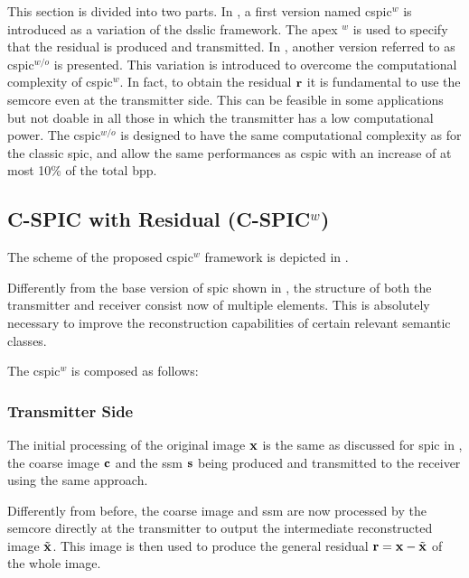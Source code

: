 This section is divided into two parts. In , a first version named \gls{cspic}$^w$ is introduced as a variation of the \gls{dsslic} framework. The apex $^w$ is used to specify that the residual is produced and transmitted. In , another version referred to as \gls{cspic}$^{w/o}$ is presented. This variation is introduced to overcome the computational complexity of \gls{cspic}$^w$. In fact, to obtain the residual $\mathbf{r}$ it is fundamental to use the \gls{semcore} even at the transmitter side. This can be feasible in some applications but not doable in all those in which the transmitter has a low computational power. The \gls{cspic}$^{w/o}$ is designed to have the same computational complexity as for the classic \gls{spic}, and allow the same performances as \gls{cspic} with an increase of at most 10\% of the total \gls{bpp}.

\subsection{C-SPIC with Residual (C-SPIC$^w$)}\label{sec: SPIC residual dsslic}

The scheme of the proposed \gls{cspic}$^w$ framework is depicted in .

Differently from the base version of \gls{spic} shown in , the structure of both the transmitter and receiver consist now of multiple elements. This is absolutely necessary  to improve the reconstruction capabilities of certain relevant semantic classes. 

The \gls{cspic}$^w$ is composed as follows:

\subsubsection{Transmitter Side}\label{sec: SPIC cspic_with transmitter}

The initial processing of the original image $\mathbf{x}$ is the same as discussed for \gls{spic} in , the coarse image $\mathbf{c}$ and the \gls{ssm} $\mathbf{s}$ being produced and transmitted to the receiver using the same approach.

Differently from before, the coarse image and \gls{ssm} are now processed by the \gls{semcore} directly at the transmitter to output the intermediate reconstructed image $\tilde{\mathbf{x}}$. This image is then used to produce the general residual $\mathbf{r} = \mathbf{x} - \tilde{\mathbf{x}}$ of the whole image.

